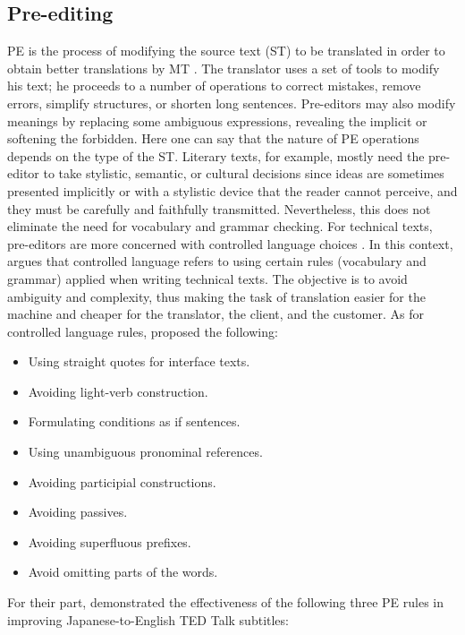 \documentclass[english]{textolivre}
\begin{document}
\subsection{Pre-editing}

PE is the process of modifying the source text (ST) to be translated in order to obtain better translations by MT \cite{miyata_understanding_2021}. The translator uses a set of tools to modify his text; he proceeds to a number of operations to correct mistakes, remove errors, simplify structures, or shorten long sentences. Pre-editors may also modify meanings by replacing some ambiguous expressions, revealing the implicit or softening the forbidden. Here one can say that the nature of PE operations depends on the type of the ST. Literary texts, for example, mostly need the pre-editor to take stylistic, semantic, or cultural decisions since ideas are sometimes presented implicitly or with a stylistic device that the reader cannot perceive, and they must be carefully and faithfully transmitted. Nevertheless, this does not eliminate the need for vocabulary and grammar checking. For technical texts, pre-editors are more concerned with controlled language choices \cite{pym1990pre}. In this context, \textcite{angelone_pre-editing_2020} argues that controlled language refers to using certain rules (vocabulary and grammar) applied when writing technical texts. The objective is to avoid ambiguity and complexity, thus making the task of translation easier for the machine and cheaper for the translator, the client, and the customer. As for controlled language rules, \textcite[p. 184]{marzouk_evaluation_2019} proposed the following:

\begin{itemize}
 \item Using straight quotes for interface texts.
 \item Avoiding light-verb construction.
 \item Formulating conditions as if sentences.
 \item Using unambiguous pronominal references.
 \item Avoiding participial constructions.
 \item Avoiding passives.
 \item Avoiding superfluous prefixes.
 \item Avoid omitting parts of the words.
\end{itemize}

For their part, \textcite[p. 66]{hiraoka2019pre} demonstrated the effectiveness of the following three PE rules in improving Japanese-to-English TED Talk subtitles:
\end{document}
